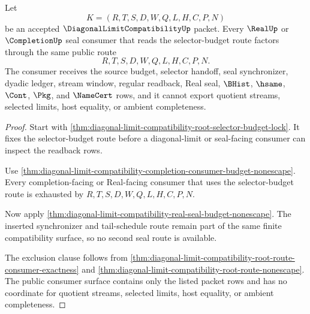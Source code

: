 \begin{theorem}
\label{thm:diagonal-limit-compatibility-seal-budget-route-exhaustion}
Let
$$
K=(R,T,S,D,W,Q,L,H,C,P,N)
$$
be an accepted $\DiagonalLimitCompatibilityUp$ packet. Every $\RealUp$ or $\CompletionUp$ seal consumer that reads the selector-budget route factors through the same public route
$$
R,T,S,D,W,Q,L,H,C,P,N .
$$
The consumer receives the source budget, selector handoff, seal synchronizer, dyadic ledger, stream window, regular readback, Real seal, $\BHist$, $\hsame$, $\Cont$, $\Pkg$, and $\NameCert$ rows, and it cannot export quotient streams, selected limits, host equality, or ambient completeness.
\end{theorem}
\begin{proof}
Start with \autoref{thm:diagonal-limit-compatibility-root-selector-budget-lock}. It fixes the selector-budget route before a diagonal-limit or seal-facing consumer can inspect the readback rows.

Use \autoref{thm:diagonal-limit-compatibility-completion-consumer-budget-nonescape}. Every completion-facing or Real-facing consumer that uses the selector-budget route is exhausted by $R,T,S,D,W,Q,L,H,C,P,N$.

Now apply \autoref{thm:diagonal-limit-compatibility-real-seal-budget-nonescape}. The inserted synchronizer and tail-schedule route remain part of the same finite compatibility surface, so no second seal route is available.

The exclusion clause follows from \autoref{thm:diagonal-limit-compatibility-root-route-consumer-exactness} and \autoref{thm:diagonal-limit-compatibility-root-route-nonescape}. The public consumer surface contains only the listed packet rows and has no coordinate for quotient streams, selected limits, host equality, or ambient completeness.
\end{proof}

